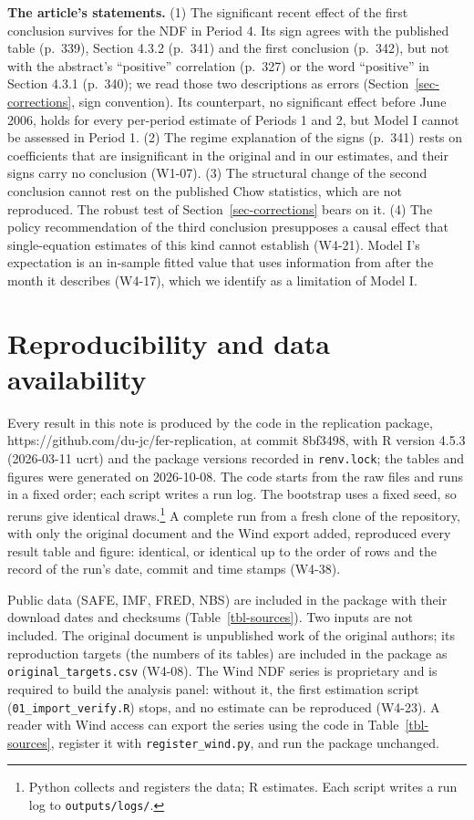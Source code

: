 \documentclass[
  12pt,
  a4paper,
]{article}
\begin{document}
\textbf{The article's statements.} (1) The significant recent effect of
the first conclusion survives for the NDF in Period 4. Its sign agrees
with the published table (p.~339), Section 4.3.2 (p.~341) and the first
conclusion (p.~342), but not with the abstract's ``positive''
correlation (p.~327) or the word ``positive'' in Section 4.3.1 (p.~340);
we read those two descriptions as errors (Section~\ref{sec-corrections},
sign convention). Its counterpart, no significant effect before June
2006, holds for every per-period estimate of Periods 1 and 2, but Model
I cannot be assessed in Period 1. (2) The regime explanation of the
signs (p.~341) rests on coefficients that are insignificant in the
original and in our estimates, and their signs carry no conclusion
(W1-07). (3) The structural change of the second conclusion cannot rest
on the published Chow statistics, which are not reproduced. The robust
test of Section~\ref{sec-corrections} bears on it. (4) The policy
recommendation of the third conclusion presupposes a causal effect that
single-equation estimates of this kind cannot establish (W4-21). Model
I's expectation is an in-sample fitted value that uses information from
after the month it describes (W4-17), which we identify as a limitation
of Model I.

\section{Reproducibility and data availability}\label{sec-availability}

Every result in this note is produced by the code in the replication
package, https://github.com/du-jc/fer-replication, at commit 8bf3498,
with R version 4.5.3 (2026-03-11 ucrt) and the package versions recorded
in \texttt{renv.lock}; the tables and figures were generated on
2026-10-08. The code starts from the raw files and runs in a fixed
order; each script writes a run log. The bootstrap uses a fixed seed, so
reruns give identical draws.\footnote{Python collects and registers the
  data; R estimates. Each script writes a run log to
  \texttt{outputs/logs/}.} A complete run from a fresh clone of the
repository, with only the original document and the Wind export added,
reproduced every result table and figure: identical, or identical up to
the order of rows and the record of the run's date, commit and time
stamps (W4-38).

Public data (SAFE, IMF, FRED, NBS) are included in the package with
their download dates and checksums (Table~\ref{tbl-sources}). Two inputs
are not included. The original document is unpublished work of the
original authors; its reproduction targets (the numbers of its tables)
are included in the package as \texttt{original\_targets.csv} (W4-08).
The Wind NDF series is proprietary and is required to build the analysis
panel: without it, the first estimation script
(\texttt{01\_import\_verify.R}) stops, and no estimate can be reproduced
(W4-23). A reader with Wind access can export the series using the code
in Table~\ref{tbl-sources}, register it with \texttt{register\_wind.py},
and run the package unchanged.
\end{document}
